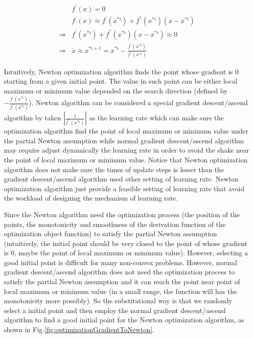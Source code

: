 \documentclass[runningheads,openany]{xhlPaper}
\begin{document}
\begin{equation}
\label{equ:optimizationNewtonOptimization}
\begin{aligned}
&{f^{'}}\left( x \right) = 0\\
&{f^{'}}\left( x \right) \approx {f^{'}}\left( {{x^{*i}}} \right) + {f^{''}}\left( {{x^{*i}}} \right)\left( {x - {x^{*i}}} \right)\\
\Rightarrow &f^{'}\left( {{x^{*i}}} \right) + {f^{''}}\left( {{x^{*i}}} \right)\left( {x - {x^{*i}}} \right) \approx 0\\
\Rightarrow &\tilde x \approx {x^{*i + 1}} = {x^{*i}} - \frac{{{f^{'}}\left( {{x^{*i}}} \right)}}{{{f^{''}}\left( {{x^{*i}}} \right)}}
\end{aligned}
\end{equation}

Intuitively, Newton optimization algorithm finds the point whose gradient is 0 starting from a given initial point. The value in such point can be either local maximum or minimum value depended on the search direction (defined by $- \frac{{{f^{'}}\left( {{x^{*i}}} \right)}}{{{f^{''}}\left( {{x^{*i}}} \right)}}$). 
Newton algorithm can be considered a special gradient descent/ascend algorithm by taken $|\frac{1}{{{f^{''}}\left( {{x^{*i}}} \right)}}|$ as the learning rate which can make sure the optimization algorithm find the point of local maximum or minimum value under the partial Newton assumption while normal gradient descent/ascend algorithm may require adjust dynamically the learning rate in order to avoid the shake near the point of local maximum or minimum value. 
Notice that Newton optimization algorithm does not make sure the times of update steps is lesser than the gradient descent/ascend algorithm used other setting of learning rate. 
Newton optimization algorithm just provide a feasible setting of learning rate that avoid the workload of designing the mechanism of learning rate.

Since the Newton algorithm need the optimization process (the position of the points, the monotonicity and smoothness of the derivation function of the optimization object function) to satisfy the partial Newton assumption (intuitively, the initial point should be very closed to the point of whose gradient is 0, maybe the point of local maximum or minimum value). However, selecting a good initial point is difficult for many non-convex problems. However, normal gradient descent/ascend algorithm does not need the optimization process to satisfy the partial Newton assumption and it can reach the point near point of local maximum or minimum value (in a small range, the function will has the monotonicity more possibly). So the substitutional way is that we randomly select a initial point and then employ the normal gradient descent/ascend algorithm to find a good initial point for the Newton optimization algorithm, as shown in Fig.\ref{fig:optimizationGradientToNewton}.
\end{document}
